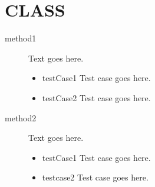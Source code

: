 \section{CLASS}
\begin{description}
	\item[method1] Text goes here.
	\begin{itemize}
		\item testCase1 Test case goes here.
		\item testCase2 Test case goes here.
	\end{itemize}
	\item[method2] Text goes here.
	\begin{itemize}
		\item testCase1 Test case goes here.
		\item testcase2 Test case goes here.
	\end{itemize}
\end{description}